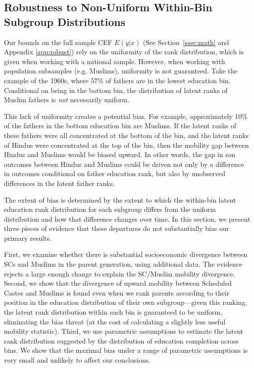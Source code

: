 \subsection{Robustness to Non-Uniform Within-Bin Subgroup
  Distributions}
\label{sec:app_within}

Our bounds on the full sample CEF $E(y|x)$ (See Section~\ref{ssec:math} and Appendix \ref{app:robust}) rely on the uniformity of the rank distribution, which is given when working with a national sample. However, when working with population subsamples (e.g. Muslims), uniformity is not guaranteed. Take the example of the 1960s, where 57\% of fathers are in the lowest education bin. Conditional on being in the bottom bin, the distribution of latent ranks of Muslim fathers is \textit{not} necessarily uniform.

This lack of uniformity creates a potential bias. For example, approximately 10\% of the fathers in the bottom education bin are Muslims. If the latent ranks of these fathers were all concentrated at the bottom of the bin, and the latent ranks of Hindus were concentrated at the top of the bin, then the mobility gap between Hindus and Muslims would be biased upward. In other words, the gap in son outcomes between Hindus and Muslims could be driven not only by a difference in outcomes conditional on father education rank, but also by unobserved differences in the latent father ranks.

The extent of bias is determined by the extent to which the within-bin latent education rank distribution for each subgroup differs from the uniform distribution and how that difference changes over time. In this section, we present three pieces of evidence that these departures do not substantially bias our primary results.

First, we examine whether there is substantial socioeconomic divergence between SCs and Muslims in the parent generation, using additional data. The evidence rejects a large enough change to explain the SC/Muslim mobility divergence. Second, we show that the divergence of upward mobility between Scheduled Castes and Muslims is found even when we rank parents according to their position in the education distribution of their own subgroup---given this ranking, the latent rank distribution within each bin is guaranteed to be uniform, eliminating the bias threat (at the cost of calculating a slightly less useful mobility statistic). Third, we use parametric assumptions to estimate the latent rank distribution suggested by the distribution of education completion across bins. We show that the maximal bias under a range of parametric assumptions is very small and unlikely to affect our conclusions.

